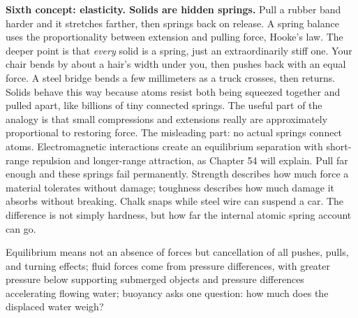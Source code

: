 \begin{mainline}
\textbf{Sixth concept: elasticity. Solids are hidden springs.} Pull a rubber band harder and it stretches farther, then springs back on release. A spring balance uses the proportionality between extension and pulling force, Hooke's law. The deeper point is that \emph{every} solid is a spring, just an extraordinarily stiff one. Your chair bends by about a hair's width under you, then pushes back with an equal force. A steel bridge bends a few millimeters as a truck crosses, then returns. Solids behave this way because atoms resist both being squeezed together and pulled apart, like billions of tiny connected springs. The useful part of the analogy is that small compressions and extensions really are approximately proportional to restoring force. The misleading part: no actual springs connect atoms. Electromagnetic interactions create an equilibrium separation with short-range repulsion and longer-range attraction, as Chapter 54 will explain. Pull far enough and these springs fail permanently. Strength describes how much force a material tolerates without damage; toughness describes how much damage it absorbs without breaking. Chalk snaps while steel wire can suspend a car. The difference is not simply hardness, but how far the internal atomic spring account can go.
\end{mainline}


\begin{oneline}
Equilibrium means not an absence of forces but cancellation of all pushes, pulls, and turning effects; fluid forces come from pressure differences, with greater pressure below supporting submerged objects and pressure differences accelerating flowing water; buoyancy asks one question: how much does the displaced water weigh?
\end{oneline}


